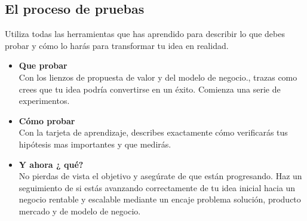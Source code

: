 \documentclass[11pt]{book}
\begin{document}
\subsection{El proceso de pruebas}
Utiliza todas las herramientas que has aprendido para describir lo que debes probar y cómo lo harás para transformar tu idea en realidad.
\begin{itemize}
\item \textbf{ Que probar }\\
Con los lienzos de propuesta de valor y del modelo de negocio., trazas como crees que tu idea podría convertirse en un éxito. Comienza una serie de experimentos.
\item \textbf{ Cómo probar }\\
Con la tarjeta de aprendizaje, describes exactamente cómo verificarás tus hipótesis mas importantes y que medirás. 
\item \textbf{ Y ahora ¿ qué? }\\
No pierdas de vista el objetivo y asegúrate de que están progresando. Haz un seguimiento de si estás avanzando correctamente de tu idea inicial hacia un negocio rentable y escalable mediante un encaje problema solución, producto mercado y de modelo de negocio.
\end{itemize}
\end{document}
